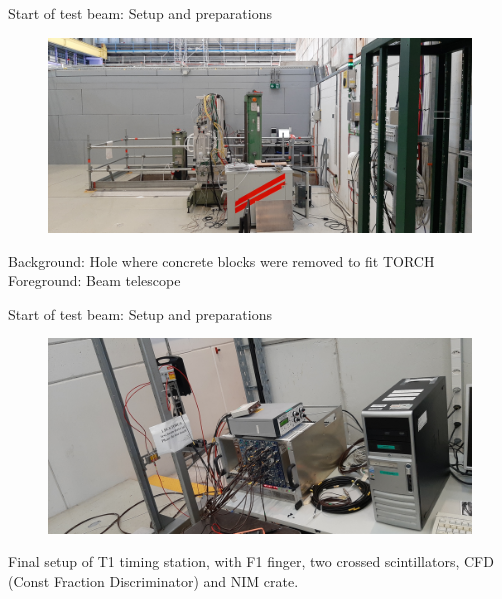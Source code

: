 \documentclass[xcolor = table]{beamer}
\begin{document}
\begin{frame}{Start of test beam: Setup and preparations}
  \begin{figure}
    \centering
    \includegraphics[width = 1.0\textwidth]{Plots/T9_Empty_floor.jpg}
  \end{figure}
  \vspace{-0.2cm}
  \begin{center}
    \large Background: Hole where concrete blocks were removed to fit TORCH\\
    \large Foreground: Beam telescope
  \end{center}
\end{frame}

\begin{frame}{Start of test beam: Setup and preparations}
  \begin{figure}
    \centering
    \includegraphics[width = 1.0\textwidth]{Plots/T1_overview.jpg}
  \end{figure}
  \vspace{-0.2cm}
  \begin{center}
    \large Final setup of T1 timing station, with F1 finger, two crossed scintillators, CFD (Const Fraction Discriminator) and NIM crate.
  \end{center}
\end{frame}
\end{document}
